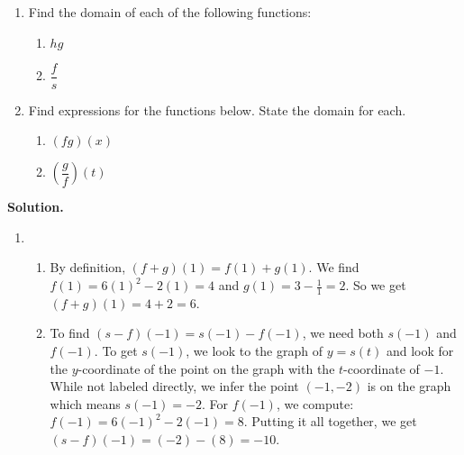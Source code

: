 \begin{ex}
\begin{enumerate}
\item  Find the domain of each of the following functions:

\begin{multicols}{2}

\begin{enumerate}

\item $hg$

\item  $\dfrac{f}{s}$

\end{enumerate}

\end{multicols}

\item \label{arithexpressionex} Find expressions for the functions below.  State the domain for each.

\begin{multicols}{2}

\begin{enumerate}

\item   \label{proddomainex} $(fg)(x)$

\item  \label{quotdomainex}  $\left(\dfrac{g}{f}\right)(t)$

\end{enumerate}

\end{multicols}

\end{enumerate}

{\bf Solution.}  

\begin{enumerate}

\item \begin{enumerate}

\item  By definition, $(f+g)(1) = f(1) + g(1)$.   We find $f(1) = 6(1)^2-2(1) = 4$ and $g(1) = 3 - \frac{1}{1} = 2$. So we get  $(f+g)(1) = 4+2 = 6$.

\item  To find $(s-f)(-1) = s(-1) - f(-1)$, we need both $s(-1)$ and $f(-1)$.  To get $s(-1)$, we look to the graph of $y = s(t)$ and look for the $y$-coordinate of the point on the graph with the $t$-coordinate of $-1$.  While not labeled directly, we infer the point $(-1,-2)$ is on the graph which means $s(-1) = -2$. For $f(-1)$, we compute: $f(-1) = 6(-1)^2-2(-1) = 8$.  Putting it all together, we get $(s-f)(-1) = (-2) -(8) = -10$.


\end{enumerate}
\end{enumerate}
\end{ex}
